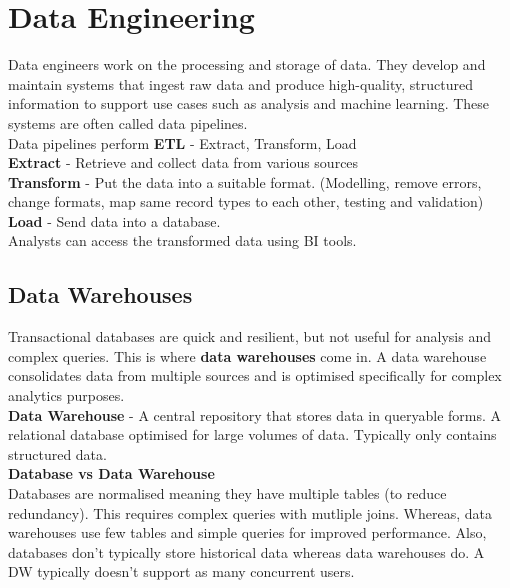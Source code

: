 \chapter{Data Engineering}

Data engineers work on the processing and storage of data. They develop and maintain 
systems that ingest raw data and produce high-quality, structured information to 
support use cases such as analysis and machine learning. These systems are often called
data pipelines.\\

Data pipelines perform \textbf{ETL} - Extract, Transform, Load\\

\textbf{Extract} - Retrieve and collect data from various sources\\

\textbf{Transform} - Put the data into a suitable format. (Modelling, remove errors, change formats, 
map same record types to each other, testing and validation)\\

\textbf{Load} - Send data into a database.\\

Analysts can access the transformed data using BI tools.\\

\section{Data Warehouses}

Transactional databases are quick and resilient, but not useful for analysis and complex queries.
This is where \textbf{data warehouses}  come in. A data warehouse consolidates data from 
multiple sources and is optimised specifically for complex analytics  purposes.\\

\textbf{Data Warehouse} - A central repository that stores data in queryable forms. A relational 
database optimised for large volumes of data. Typically only contains structured data.\\

\textbf{Database vs Data Warehouse}\\

Databases are normalised meaning they have multiple tables (to reduce redundancy). This requires 
complex queries with mutliple joins. Whereas, data warehouses use few tables and simple queries for 
improved performance. Also, databases don't typically store historical data whereas data warehouses do.
A DW typically doesn't support as many concurrent users.\\

